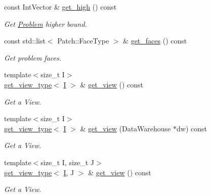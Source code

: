 \begin{DoxyCompactItemize}
const Int\+Vector \& \hyperlink{classUintah_1_1PhaseField_1_1Problem_aa69624e71f479931c650be25eff2e12d}{get\+\_\+high} () const
\begin{DoxyCompactList}\small\item\em Get \hyperlink{classUintah_1_1PhaseField_1_1Problem}{Problem} higher bound. \end{DoxyCompactList}\item 
const std\+::list$<$ Patch\+::\+Face\+Type $>$ \& \hyperlink{classUintah_1_1PhaseField_1_1Problem_a80d11dd3a973d867f46c5f663b4c6091}{get\+\_\+faces} () const
\begin{DoxyCompactList}\small\item\em Get problem faces. \end{DoxyCompactList}\item 
{\footnotesize template$<$size\+\_\+t I$>$ }\\\hyperlink{classUintah_1_1PhaseField_1_1Problem_a53d941e785f501dddb8c369644eae4fa}{get\+\_\+view\+\_\+type}$<$ \hyperlink{structUintah_1_1PhaseField_1_1I}{I} $>$ \& \hyperlink{classUintah_1_1PhaseField_1_1Problem_ae68b96eca7d1f30b9cac99498a110de1}{get\+\_\+view} () const
\begin{DoxyCompactList}\small\item\em Get a View. \end{DoxyCompactList}\item 
{\footnotesize template$<$size\+\_\+t I$>$ }\\\hyperlink{classUintah_1_1PhaseField_1_1Problem_a53d941e785f501dddb8c369644eae4fa}{get\+\_\+view\+\_\+type}$<$ \hyperlink{structUintah_1_1PhaseField_1_1I}{I} $>$ \& \hyperlink{classUintah_1_1PhaseField_1_1Problem_a8dcb90397ce9ca79e94d65ea54096288}{get\+\_\+view} (Data\+Warehouse $\ast$dw) const
\begin{DoxyCompactList}\small\item\em Get a View. \end{DoxyCompactList}\item 
{\footnotesize template$<$size\+\_\+t I, size\+\_\+t J$>$ }\\\hyperlink{classUintah_1_1PhaseField_1_1Problem_a53d941e785f501dddb8c369644eae4fa}{get\+\_\+view\+\_\+type}$<$ \hyperlink{structUintah_1_1PhaseField_1_1I}{I}, J $>$ \& \hyperlink{classUintah_1_1PhaseField_1_1Problem_aaca1687245d8afb5c1a86e076cf332fb}{get\+\_\+view} () const
\begin{DoxyCompactList}\small\item\em Get a View. \end{DoxyCompactList}\item 

\end{DoxyCompactItemize}
